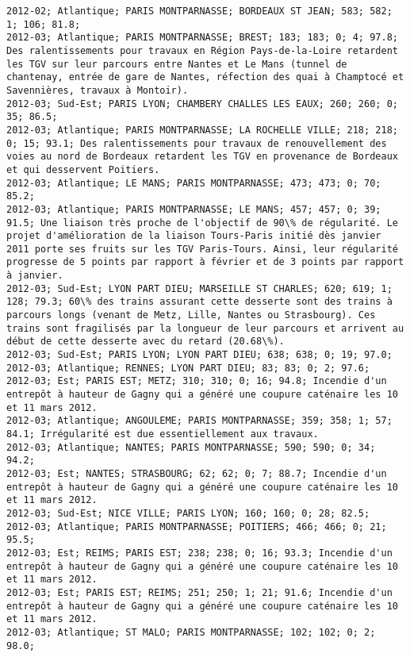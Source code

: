 \documentclass{article}
\begin{document}
\begin{Verbatim}[commandchars=\\\{\}]
2012-02; Atlantique; PARIS MONTPARNASSE; BORDEAUX ST JEAN; 583; 582; 1; 106; 81.8; 
2012-03; Atlantique; PARIS MONTPARNASSE; BREST; 183; 183; 0; 4; 97.8; Des ralentissements pour travaux en Région Pays-de-la-Loire retardent les TGV sur leur parcours entre Nantes et Le Mans (tunnel de chantenay, entrée de gare de Nantes, réfection des quai à Champtocé et Savennières, travaux à Montoir).
2012-03; Sud-Est; PARIS LYON; CHAMBERY CHALLES LES EAUX; 260; 260; 0; 35; 86.5; 
2012-03; Atlantique; PARIS MONTPARNASSE; LA ROCHELLE VILLE; 218; 218; 0; 15; 93.1; Des ralentissements pour travaux de renouvellement des voies au nord de Bordeaux retardent les TGV en provenance de Bordeaux et qui desservent Poitiers.
2012-03; Atlantique; LE MANS; PARIS MONTPARNASSE; 473; 473; 0; 70; 85.2; 
2012-03; Atlantique; PARIS MONTPARNASSE; LE MANS; 457; 457; 0; 39; 91.5; Une liaison très proche de l'objectif de 90\% de régularité. Le projet d'amélioration de la liaison Tours-Paris initié dès janvier 2011 porte ses fruits sur les TGV Paris-Tours. Ainsi, leur régularité progresse de 5 points par rapport à février et de 3 points par rapport à janvier.
2012-03; Sud-Est; LYON PART DIEU; MARSEILLE ST CHARLES; 620; 619; 1; 128; 79.3; 60\% des trains assurant cette desserte sont des trains à parcours longs (venant de Metz, Lille, Nantes ou Strasbourg). Ces trains sont fragilisés par la longueur de leur parcours et arrivent au début de cette desserte avec du retard (20.68\%).
2012-03; Sud-Est; PARIS LYON; LYON PART DIEU; 638; 638; 0; 19; 97.0; 
2012-03; Atlantique; RENNES; LYON PART DIEU; 83; 83; 0; 2; 97.6; 
2012-03; Est; PARIS EST; METZ; 310; 310; 0; 16; 94.8; Incendie d'un entrepôt à hauteur de Gagny qui a généré une coupure caténaire les 10 et 11 mars 2012.
2012-03; Atlantique; ANGOULEME; PARIS MONTPARNASSE; 359; 358; 1; 57; 84.1; Irrégularité est due essentiellement aux travaux.
2012-03; Atlantique; NANTES; PARIS MONTPARNASSE; 590; 590; 0; 34; 94.2; 
2012-03; Est; NANTES; STRASBOURG; 62; 62; 0; 7; 88.7; Incendie d'un entrepôt à hauteur de Gagny qui a généré une coupure caténaire les 10 et 11 mars 2012.
2012-03; Sud-Est; NICE VILLE; PARIS LYON; 160; 160; 0; 28; 82.5; 
2012-03; Atlantique; PARIS MONTPARNASSE; POITIERS; 466; 466; 0; 21; 95.5; 
2012-03; Est; REIMS; PARIS EST; 238; 238; 0; 16; 93.3; Incendie d'un entrepôt à hauteur de Gagny qui a généré une coupure caténaire les 10 et 11 mars 2012.
2012-03; Est; PARIS EST; REIMS; 251; 250; 1; 21; 91.6; Incendie d'un entrepôt à hauteur de Gagny qui a généré une coupure caténaire les 10 et 11 mars 2012.
2012-03; Atlantique; ST MALO; PARIS MONTPARNASSE; 102; 102; 0; 2; 98.0; 

\end{Verbatim}
\end{document}
